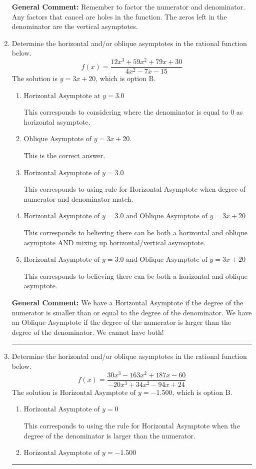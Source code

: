 \documentclass{extbook}[14pt]
\newcommand{\litem}[1]{\item #1

\rule{\textwidth}{0.4pt}}
\begin{document}
\begin{enumerate}
{\textbf{General Comment:} Remember to factor the numerator and denominator. Any factors that cancel are holes in the function. The zeros left in the denominator are the vertical asymptotes.
}
\litem{
Determine the horizontal and/or oblique asymptotes in the rational function below.
\[ f(x) = \frac{12x^{3} +59 x^{2} +79 x + 30}{4x^{2} -7 x -15} \]The solution is \( y = 3x + 20 \), which is option B.\begin{enumerate}[label=\Alph*.]
\item \( \text{Horizontal Asymptote at } y = 3.0 \)

This corresponds to considering where the denominator is equal to 0 as horizontal asymptote.
\item \( \text{Oblique Asymptote of } y = 3x + 20. \)

This is the correct answer.
\item \( \text{Horizontal Asymptote of } y = 3.0  \)

This corresponds to using rule for Horizontal Asymptote when degree of numerator and denominator match.
\item \( \text{Horizontal Asymptote of } y = 3.0 \text{ and Oblique Asymptote of } y = 3x + 20 \)

This corresponds to believing there can be both a horizontal and oblique asymptote AND mixing up horizontal/vertical asymoptote.
\item \( \text{Horizontal Asymptote of } y = 3.0 \text{ and Oblique Asymptote of } y = 3x + 20 \)

This corresponds to believing there can be both a horizontal and oblique asymptote.
\end{enumerate}

\textbf{General Comment:} We have a Horizontal Asymptote if the degree of the numerator is smaller than or equal to the degree of the denominator. We have an Oblique Asymptote if the degree of the numerator is larger than the degree of the denominator. We cannot have both!
}
\litem{
Determine the horizontal and/or oblique asymptotes in the rational function below.
\[ f(x) = \frac{30x^{3} -163 x^{2} +187 x -60}{-20x^{3} +34 x^{2} -94 x + 24} \]The solution is \( \text{Horizontal Asymptote of } y = -1.500  \), which is option B.\begin{enumerate}[label=\Alph*.]
\item \( \text{Horizontal Asymptote of } y = 0  \)

This corresponds to using the rule for Horizontal Asymptote when the degree of the denominator is larger than the numerator.
\item \( \text{Horizontal Asymptote of } y = -1.500  \)


\end{enumerate}}
\end{enumerate}
\end{document}
